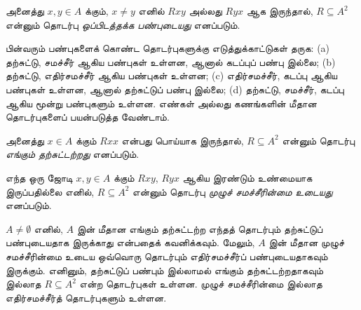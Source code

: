 \documentclass[../../../include/open-logic-section]{subfiles}
\begin{document}
\begin{defn}[ஒப்பிடத்தக்க பண்பு]
அனைத்து $x,y\in A$ க்கும், $x \neq y$ எனில் $Rxy$ அல்லது $Ryx$
ஆக இருந்தால், $R \subseteq A^2$ என்னும் தொடர்பு
\emph{ஒப்பிடத்தக்க பண்புடையது} எனப்படும்.
\end{defn}

\begin{prob}
பின்வரும் பண்புகளைக் கொண்ட தொடர்புகளுக்கு எடுத்துக்காட்டுகள் தருக:
(a) தற்சுட்டு, சமச்சீர் ஆகிய பண்புகள் உள்ளன, ஆனால் கடப்புப் பண்பு இல்லை;
(b) தற்சுட்டு, எதிர்சமச்சீர் ஆகிய பண்புகள் உள்ளன;
(c) எதிர்சமச்சீர், கடப்பு ஆகிய பண்புகள் உள்ளன, ஆனால் தற்சுட்டுப் பண்பு இல்லை;
(d) தற்சுட்டு, சமச்சீர், கடப்பு ஆகிய மூன்று பண்புகளும் உள்ளன.
எண்கள் அல்லது கணங்களின் மீதான தொடர்புகளைப் பயன்படுத்த வேண்டாம்.
\end{prob}

\begin{defn}[எங்கும் தற்சுட்டின்மை]
அனைத்து $x \in A$ க்கும் $Rxx$ என்பது பொய்யாக இருந்தால்,
$R \subseteq A^2$ என்னும் தொடர்பு \emph{எங்கும் தற்சுட்டற்றது} எனப்படும்.
\end{defn}

\begin{defn}[முழுச் சமச்சீரின்மை]
எந்த ஒரு ஜோடி $x,y\in A$ க்கும் $Rxy$, $Ryx$ ஆகிய இரண்டும்
உண்மையாக இருப்பதில்லை எனில், $R \subseteq A^2$ என்னும் தொடர்பு
\emph{முழுச் சமச்சீரின்மை உடையது} எனப்படும்.
\end{defn}

$A \neq \emptyset$ எனில், $A$ இன் மீதான எங்கும் தற்சுட்டற்ற எந்தத்
தொடர்பும் தற்சுட்டுப் பண்புடையதாக இருக்காது என்பதைக் கவனிக்கவும்.
மேலும், $A$ இன் மீதான முழுச் சமச்சீரின்மை உடைய ஒவ்வொரு தொடர்பும்
எதிர்சமச்சீர்ப் பண்புடையதாகவும் இருக்கும்.
எனினும், தற்சுட்டுப் பண்பும் இல்லாமல் எங்கும் தற்சுட்டற்றதாகவும் இல்லாத
$R \subseteq A^2$ என்ற தொடர்புகள் உள்ளன.
முழுச் சமச்சீரின்மை இல்லாத எதிர்சமச்சீர்த் தொடர்புகளும் உள்ளன.
\end{document}
